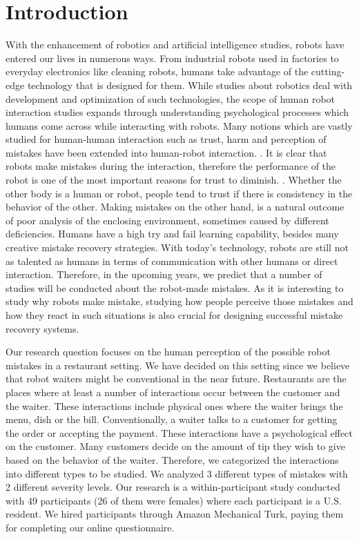 \documentclass{sigchi}
\begin{document}
\section{Introduction}

With the enhancement of robotics and artificial intelligence studies, robots have entered our lives in numerous ways. From industrial robots used in factories to everyday electronics like cleaning robots, humans take advantage of the cutting-edge technology that is designed for them. While studies about robotics deal with development and optimization of such technologies, the scope of human robot interaction studies expands through understanding psychological processes which humans come across while interacting with robots. Many notions which are vastly studied for human-human interaction such as trust, harm and perception of mistakes have been extended into human-robot interaction. \cite{freedy2007measurement}. It is clear that robots make mistakes during the interaction, therefore the performance of the robot is one of the most important reasons for trust to diminish. \cite{hancock2011meta}. Whether the other body is a human or robot, people tend to trust if there is consistency in the behavior of the other. Making mistakes on the other hand, is a natural outcome of poor analysis of the enclosing environment, sometimes caused by different deficiencies. Humans have a high try and fail learning capability, besides many creative mistake recovery strategies. With today's technology, robots are still not as talented as humans in terms of communication with other humans or direct interaction. Therefore, in the upcoming years, we predict that a number of studies will be conducted about the robot-made mistakes. As it is interesting to study why robots make mistake, studying how people perceive those mistakes and how they react in such situations is also crucial for designing successful mistake recovery systems.

Our research question focuses on the human perception of the possible robot mistakes in a restaurant setting. We have decided on this setting since we believe that robot waiters might be conventional in the near future. Restaurants are the places where at least a number of interactions occur between the customer and the waiter. These interactions include physical ones where the waiter brings the menu, dish or the bill. Conventionally, a waiter talks to a customer for getting the order or accepting the payment. These interactions have a psychological effect on the customer. Many customers decide on the amount of tip they wish to give based on the behavior of the waiter. Therefore, we categorized the interactions into different types to be studied.  We analyzed 3 different types of mistakes with 2 different severity levels. Our research is a within-participant study conducted with 49 participants (26 of them were females) where each participant is a U.S. resident. We hired participants through Amazon Mechanical Turk, paying them for completing our online questionnaire. 
\end{document}

